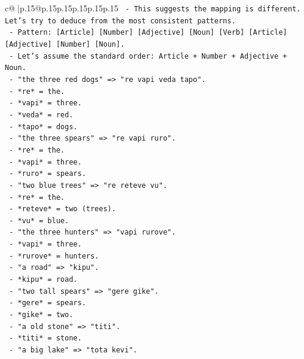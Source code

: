 \documentclass{article}
\begin{document}
{\begin{supertabular}{c@{$\;$}|p{.15\linewidth}@{}p{.15\linewidth}p{.15\linewidth}p{.15\linewidth}p{.15\linewidth}p{.15\linewidth}}
{{{\texttt{          {-} This suggests the mapping is different. Let's try to deduce from the most consistent patterns.} \\
\texttt{          {-} Pattern: {[}Article{]} {[}Number{]} {[}Adjective{]} {[}Noun{]} {[}Verb{]} {[}Article{]} {[}Adjective{]} {[}Number{]} {[}Noun{]}.} \\
\texttt{          {-} Let's assume the standard order: Article + Number + Adjective + Noun.} \\
\texttt{          {-} "the three red dogs" => "re vapi veda tapo".} \\
\texttt{            {-} *re* = the.} \\
\texttt{            {-} *vapi* = three.} \\
\texttt{            {-} *veda* = red.} \\
\texttt{            {-} *tapo* = dogs.} \\
\texttt{          {-} "the three spears" => "re vapi ruro".} \\
\texttt{            {-} *re* = the.} \\
\texttt{            {-} *vapi* = three.} \\
\texttt{            {-} *ruro* = spears.} \\
\texttt{          {-} "two blue trees" => "re reteve vu".} \\
\texttt{            {-} *re* = the.} \\
\texttt{            {-} *reteve* = two (trees).} \\
\texttt{            {-} *vu* = blue.} \\
\texttt{          {-} "the three hunters" => "vapi rurove".} \\
\texttt{            {-} *vapi* = three.} \\
\texttt{            {-} *rurove* = hunters.} \\
\texttt{          {-} "a road" => "kipu".} \\
\texttt{            {-} *kipu* = road.} \\
\texttt{          {-} "two tall spears" => "gere gike".} \\
\texttt{            {-} *gere* = spears.} \\
\texttt{            {-} *gike* = two.} \\
\texttt{          {-} "a old stone" => "titi".} \\
\texttt{            {-} *titi* = stone.} \\
\texttt{          {-} "a big lake" => "tota kevi".} \\
}}}
\end{supertabular}}
\end{document}

